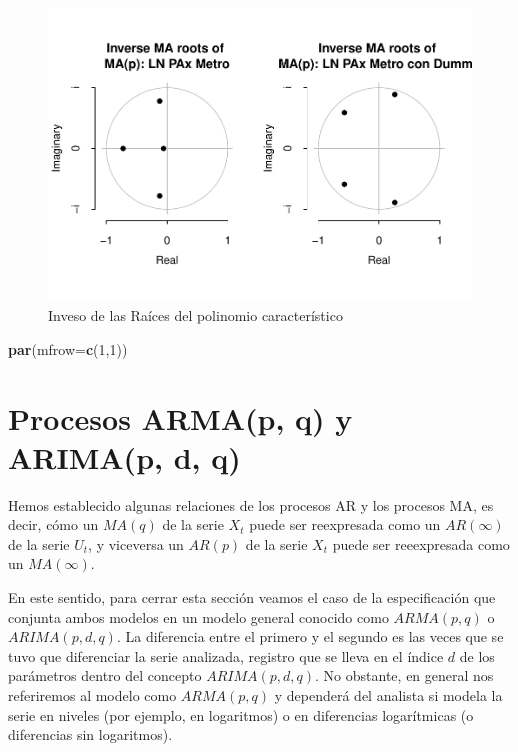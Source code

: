 \documentclass[
]{book}
\newenvironment{Shaded}{\begin{snugshade}}{\end{snugshade}}
\newcommand{\AttributeTok}[1]{\textcolor[rgb]{0.13,0.29,0.53}{#1}}
\newcommand{\DecValTok}[1]{\textcolor[rgb]{0.00,0.00,0.81}{#1}}
\newcommand{\FunctionTok}[1]{\textcolor[rgb]{0.13,0.29,0.53}{\textbf{#1}}}
\newcommand{\NormalTok}[1]{#1}
\begin{document}
\begin{figure}

{\centering \includegraphics{Notas-Series-Tiempo_files/figure-latex/fig411-1} 

}

\caption{Inveso de las Raíces del polinomio característico}\label{fig:fig411}
\end{figure}

\begin{Shaded}
\begin{Highlighting}[]
\FunctionTok{par}\NormalTok{(}\AttributeTok{mfrow=}\FunctionTok{c}\NormalTok{(}\DecValTok{1}\NormalTok{,}\DecValTok{1}\NormalTok{))}
\end{Highlighting}
\end{Shaded}

\hypertarget{procesos-armap-q-y-arimap-d-q}{%
\section{Procesos ARMA(p, q) y ARIMA(p, d, q)}\label{procesos-armap-q-y-arimap-d-q}}

Hemos establecido algunas relaciones de los procesos AR y los procesos MA, es decir, cómo un \(MA(q)\) de la serie \(X_t\) puede ser reexpresada como un \(AR(\infty)\) de la serie \(U_t\), y viceversa un \(AR(p)\) de la serie \(X_t\) puede ser reeexpresada como un \(MA(\infty)\).

En este sentido, para cerrar esta sección veamos el caso de la especificación que conjunta ambos modelos en un modelo general conocido como \(ARMA(p, q)\) o \(ARIMA(p, d, q)\). La diferencia entre el primero y el segundo es las veces que se tuvo que diferenciar la serie analizada, registro que se lleva en el índice \(d\) de los parámetros dentro del concepto \(ARIMA(p, d, q)\). No obstante, en general nos referiremos al modelo como \(ARMA(p, q)\) y dependerá del analista si modela la serie en niveles (por ejemplo, en logaritmos) o en diferencias logarítmicas (o diferencias sin logaritmos).
\end{document}
